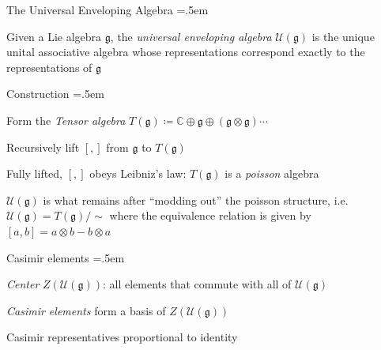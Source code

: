 \documentclass[xcolor={dvipsnames}]{beamer}
\let\olditemize=\itemize
\let\endolditemize=\enditemize
\renewenvironment{itemize}{\olditemize \itemsep=.5em }{\endolditemize}
\begin{document}
\begin{frame}{The Universal Enveloping Algebra}
    \begin{itemize}
        \item<2-> Given a Lie algebra $\mathfrak{g}$, the \textit{universal enveloping algebra} $\mathscr{U}(\mathfrak{g})$ is the unique unital associative algebra whose representations correspond exactly to the representations of $\mathfrak{g}$
        \item<3-> Construction
        \begin{itemize}
            \item<4-> Form the \textit{Tensor algebra} $T(\mathfrak{g}) \coloneqq \mathbb{C} \oplus \mathfrak{g} \oplus \left(\mathfrak{g}\otimes\mathfrak{g}\right) \cdots$
            \item<5-> Recursively lift $[,]$ from $\mathfrak{g}$ to $T(\mathfrak{g})$
            \item<6-> Fully lifted, $[,]$ obeys Leibniz's law: $T(\mathfrak{g})$ is a \textit{poisson} algebra
            \item<7-> $\mathscr{U}(\mathfrak{g})$ is what remains after ``modding out'' the poisson structure, i.e. $\mathscr{U}(\mathfrak{g}) = T(\mathfrak{g}) / \sim$ where the equivalence relation is given by $[a,b] = a\otimes b - b\otimes a$ 
        \end{itemize}
        \item<8-> Casimir elements
        \begin{itemize}
            \item<9-> \textit{Center} $Z(\mathscr{U}(\mathfrak{g}))$: all elements that commute with all of $\mathscr{U}(\mathfrak{g})$
            \item<10-> \textit{Casimir elements} form a basis of $Z(\mathscr{U}(\mathfrak{g}))$
            \item<11-> Casimir representatives proportional to identity
        \end{itemize}
    \end{itemize}
\end{frame}
\end{document}
